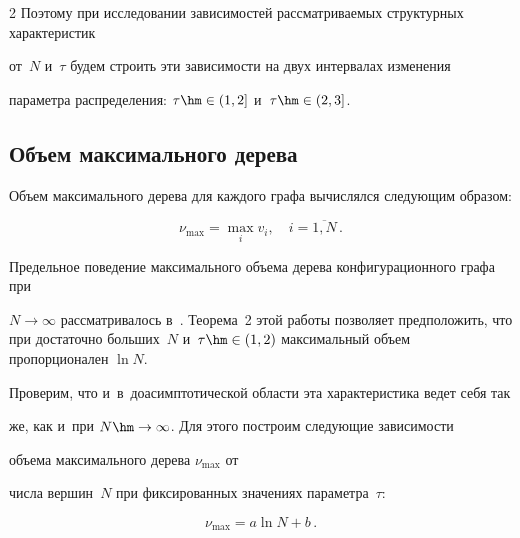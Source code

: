 \begin{multicols}{2}
Поэтому при исследовании зависимостей рас\-смат\-ри\-ва\-емых структурных характеристик 


от~$N$ и~$\tau$ будем строить эти зависимости на двух интервалах изменения 


параметра распределения: $\tau\hm\in(1,2]$ и~$\tau\hm\in(2,3]$.





\vspace*{-6pt}





\subsection{Объем максимального дерева}





Объем максимального дерева для каждого графа вычислялся следующим образом:


\begin{equation*}


\nu_{\max}=\max\limits_{i}v_i, \quad i=\overline{1,N}\,.


\end{equation*}





Предельное поведение максимального объема дерева конфигурационного графа при 


$N\rightarrow\infty$ рассматривалось в~\cite{Pav}. Теорема~2 этой работы позволяет предположить, что при достаточно больших~$N$ и~$\tau\hm\in (1,2)$ максимальный объем пропорционален $\ln N$.


Проверим, что и~в~доасимптотической области эта характеристика ведет себя так 


же, как и~при $N\hm\rightarrow\infty$. Для этого построим следующие зависимости 


объема максимального дерева $\nu_{\max}$ от


числа вершин~$N$ при фиксированных значениях параметра~$\tau$:


\begin{equation}


\label{eq3}


\nu_{\max} = a \ln N + b\,.


\end{equation}






\end{multicols}
